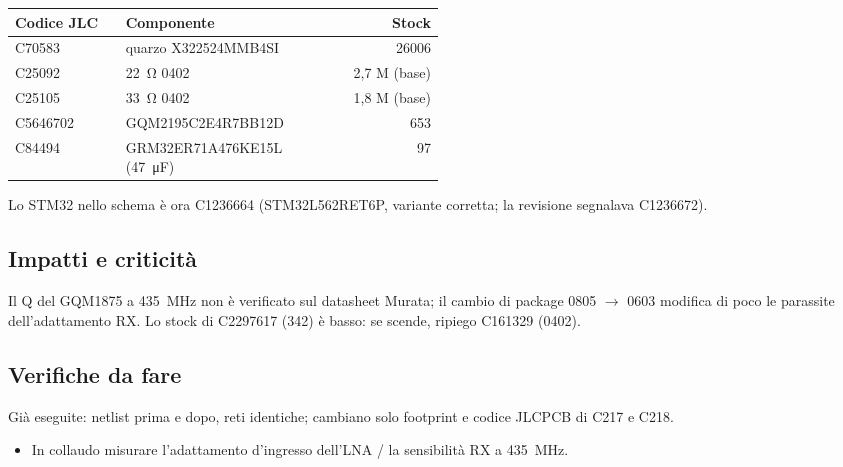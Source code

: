 {\small{}
\begin{tabular}{@{}l>{\raggedright\arraybackslash}p{0.5\linewidth}r@{}}
\toprule
\textbf{Codice JLC} & \textbf{Componente} & \textbf{Stock}\\
\midrule
C70583 & quarzo X322524MMB4SI & 26006\\
C25092 & \SI{22}{\ohm} 0402 & 2,7 M (base)\\
C25105 & \SI{33}{\ohm} 0402 & 1,8 M (base)\\
C5646702 & GQM2195C2E4R7BB12D & 653\\
C84494 & GRM32ER71A476KE15L (\SI{47}{\micro\farad}) & 97\\
\bottomrule
\end{tabular}}

Lo STM32 nello schema è ora C1236664 (STM32L562RET6P, variante corretta; la revisione segnalava C1236672).

\subsection{Impatti e criticità}
\begin{notebox}
Il Q del GQM1875 a \SI{435}{\mega\hertz} non è verificato sul datasheet Murata; il cambio di package 0805 $\rightarrow$ 0603 modifica di poco le parassite dell'adattamento RX. Lo stock di C2297617 (342) è basso: se scende, ripiego C161329 (0402).
\end{notebox}

\subsection{Verifiche da fare}
Già eseguite: netlist prima e dopo, reti identiche; cambiano solo footprint e codice JLCPCB di C217 e C218.
\begin{itemize}
\item In collaudo misurare l'adattamento d'ingresso dell'LNA / la sensibilità RX a \SI{435}{\mega\hertz}.
\end{itemize}
